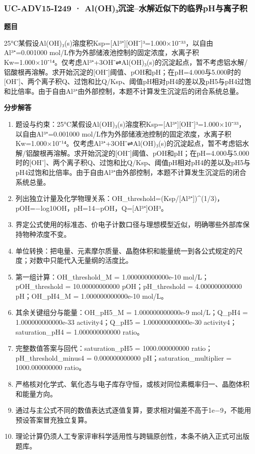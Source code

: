 \documentclass[UTF8,11pt,a4paper]{ctexart}
\begin{document}
\subsubsection*{UC-ADV15-I249 · Al(OH)₃沉淀–水解近似下的临界pH与离子积}
\noindent\textbf{题目}\par
25°C某假设Al(OH)₃(s)溶度积Ksp=[Al³⁺][OH⁻]³=1.000×10⁻³³，以自由Al³⁺=0.001000 mol/L作为外部储液池控制的固定浓度，水离子积Kw=1.000×10⁻¹⁴。仅考虑Al³⁺+3OH⁻⇌Al(OH)₃(s)的沉淀起点，暂不考虑铝水解/铝酸根再溶解。求开始沉淀的[OH⁻]阈值、pOH和pH；在pH=4.000与5.000时的[OH⁻]、两个离子积Q、过饱和比Q/Ksp、阈值pH相对pH4的差以及pH5与pH4过饱和比倍率。由于自由Al³⁺由外部控制，本题不计算发生沉淀后的闭合系统总量。\par
\medskip\noindent\textbf{分步解答}
\begin{enumerate}
\item 题设与约束：25°C某假设Al(OH)₃(s)溶度积Ksp=[Al³⁺][OH⁻]³=1.000×10⁻³³，以自由Al³⁺=0.001000 mol/L作为外部储液池控制的固定浓度，水离子积Kw=1.000×10⁻¹⁴。仅考虑Al³⁺+3OH⁻⇌Al(OH)₃(s)的沉淀起点，暂不考虑铝水解/铝酸根再溶解。求开始沉淀的[OH⁻]阈值、pOH和pH；在pH=4.000与5.000时的[OH⁻]、两个离子积Q、过饱和比Q/Ksp、阈值pH相对pH4的差以及pH5与pH4过饱和比倍率。由于自由Al³⁺由外部控制，本题不计算发生沉淀后的闭合系统总量。
\item 列出独立计量及化学物理关系：OH\_threshold=(Ksp/[Al³⁺])\textasciicircum{}(1/3)，pOH=−log10OH，pH=14−pOH，Q=[Al³⁺]OH³。
\item 界定公式使用的标准态、价电子计数口径与理想模型近似，明确哪些外部库保持物种浓度不变。
\item 单位转换：把电量、元素摩尔质量、晶胞体积和能量统一到各公式规定的尺度；对数中只能代入无量纲的活度比。
\item 第一组计算：OH\_threshold\_M = 1.000000000000e-10 mol/L；pOH\_threshold = 10.00000000000 pOH；pH\_threshold = 4.000000000000 pH；OH\_pH4\_M = 1.000000000000e-10 mol/L。
\item 其余关键组分与能量：OH\_pH5\_M = 1.000000000000e-9 mol/L；Q\_pH4 = 1.000000000000e-33 activity4；Q\_pH5 = 1.000000000000e-30 activity4；saturation\_pH4 = 1.000000000000 ratio。
\item 完整数值答案与回代：saturation\_pH5 = 1000.000000000 ratio；pH\_threshold\_minus4 = 0.000000000000 pH；saturation\_multiplier = 1000.000000000 ratio。
\item 严格核对化学式、氧化态与电子库存守恒，或核对同位素概率归一、晶胞体积和能量方向。
\item 通过与主公式不同的数值表达式逐值复算，要求相对偏差不高于1e−9，不能用预设答案冒充独立复算。
\item 理论计算仍须人工专家评审科学适用性与跨辑原创性，本条不纳入正式可出版题库。
\end{enumerate}
\end{document}

